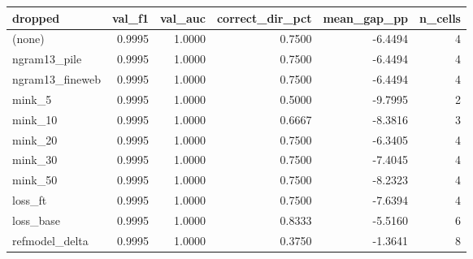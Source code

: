 \begin{tabular}{lrrrrr}
\toprule
dropped & val_f1 & val_auc & correct_dir_pct & mean_gap_pp & n_cells \\
\midrule
(none) & 0.9995 & 1.0000 & 0.7500 & -6.4494 & 4 \\
ngram13_pile & 0.9995 & 1.0000 & 0.7500 & -6.4494 & 4 \\
ngram13_fineweb & 0.9995 & 1.0000 & 0.7500 & -6.4494 & 4 \\
mink_5 & 0.9995 & 1.0000 & 0.5000 & -9.7995 & 2 \\
mink_10 & 0.9995 & 1.0000 & 0.6667 & -8.3816 & 3 \\
mink_20 & 0.9995 & 1.0000 & 0.7500 & -6.3405 & 4 \\
mink_30 & 0.9995 & 1.0000 & 0.7500 & -7.4045 & 4 \\
mink_50 & 0.9995 & 1.0000 & 0.7500 & -8.2323 & 4 \\
loss_ft & 0.9995 & 1.0000 & 0.7500 & -7.6394 & 4 \\
loss_base & 0.9995 & 1.0000 & 0.8333 & -5.5160 & 6 \\
refmodel_delta & 0.9995 & 1.0000 & 0.3750 & -1.3641 & 8 \\
\bottomrule
\end{tabular}

